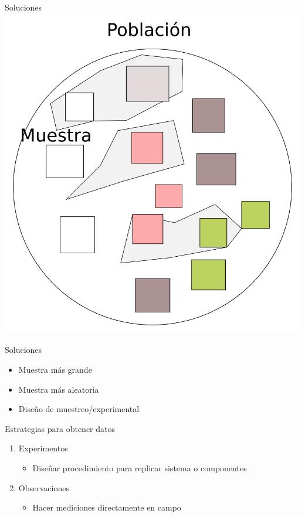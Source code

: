 \documentclass[
  11pt,
  ignorenonframetext,
]{beamer}
\providecommand{\tightlist}{%
  \setlength{\itemsep}{0pt}\setlength{\parskip}{0pt}}
\begin{document}
\begin{frame}{Soluciones}
\protect\hypertarget{soluciones}{}
\includegraphics{Figuras-poblacion/Sesgo-2.png}
\end{frame}

\begin{frame}{Soluciones}
\protect\hypertarget{soluciones-1}{}
\begin{itemize}
\item
  Muestra más grande
\item
  Muestra más aleatoria
\item
  Diseño de muestreo/experimental
\end{itemize}
\end{frame}

\begin{frame}{Estrategias para obtener datos}
\protect\hypertarget{estrategias-para-obtener-datos}{}
\begin{enumerate}
\item
  Experimentos

  \begin{itemize}
  \tightlist
  \item
    Diseñar procedimiento para replicar sistema o componentes
  \end{itemize}
\item
  Observaciones

  \begin{itemize}
  \tightlist
  \item
    Hacer mediciones directamente en campo
  \end{itemize}
\end{enumerate}
\end{frame}
\end{document}
